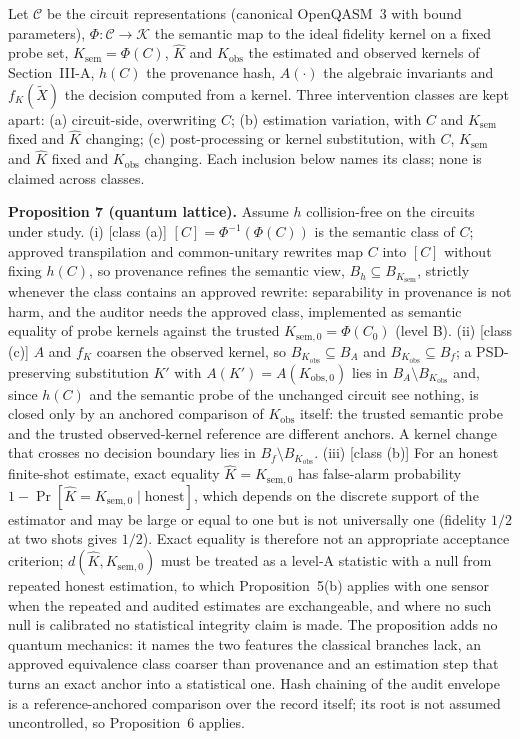 \documentclass[10pt,journal,compsoc]{IEEEtran}
\begin{document}
Let $\mathcal C$ be the circuit representations (canonical OpenQASM~3 with
bound parameters), $\Phi:\mathcal C\to\mathcal K$ the semantic map to the
ideal fidelity kernel on a fixed probe set, $K_{\mathrm{sem}}=\Phi(C)$,
$\hat K$ and $K_{\mathrm{obs}}$ the estimated and observed kernels of
Section~III-A, $h(C)$ the provenance hash, $A(\cdot)$ the algebraic
invariants and $f_K(\tilde X)$ the decision computed from a kernel. Three
intervention classes are kept apart: (a) circuit-side, overwriting $C$; (b)
estimation variation, with $C$ and $K_{\mathrm{sem}}$ fixed and $\hat K$
changing; (c) post-processing or kernel substitution, with $C$,
$K_{\mathrm{sem}}$ and $\hat K$ fixed and $K_{\mathrm{obs}}$ changing. Each
inclusion below names its class; none is claimed across classes.

\textbf{Proposition 7 (quantum lattice).} Assume $h$ collision-free on the
circuits under study. (i) [class (a)] $[C]=\Phi^{-1}(\Phi(C))$ is the
semantic class of $C$; approved transpilation and common-unitary rewrites map
$C$ into $[C]$ without fixing $h(C)$, so provenance refines the semantic
view, $B_h\subseteq B_{K_{\mathrm{sem}}}$, strictly whenever the class
contains an approved rewrite: separability in provenance is not harm, and the
auditor needs the approved class, implemented as semantic equality of probe
kernels against the trusted $K_{\mathrm{sem},0}=\Phi(C_0)$ (level B).
(ii) [class (c)] $A$ and $f_K$ coarsen the observed kernel, so
$B_{K_{\mathrm{obs}}}\subseteq B_A$ and $B_{K_{\mathrm{obs}}}\subseteq B_f$;
a PSD-preserving substitution $K'$ with $A(K')=A(K_{\mathrm{obs},0})$ lies in
$B_A\setminus B_{K_{\mathrm{obs}}}$ and, since $h(C)$ and the semantic probe
of the unchanged circuit see nothing, is closed only by an anchored
comparison of $K_{\mathrm{obs}}$ itself: the trusted semantic probe and the
trusted observed-kernel reference are different anchors. A kernel change that
crosses no decision boundary lies in $B_f\setminus B_{K_{\mathrm{obs}}}$.
(iii) [class (b)] For an honest finite-shot estimate, exact equality
$\hat K=K_{\mathrm{sem},0}$ has false-alarm probability
$1-\Pr[\hat K=K_{\mathrm{sem},0}\mid\text{honest}]$, which depends on the
discrete support of the estimator and may be large or equal to one but is
not universally one (fidelity $1/2$ at two shots gives $1/2$). Exact equality
is therefore not an appropriate acceptance criterion;
$d(\hat K,K_{\mathrm{sem},0})$ must be treated as a level-A statistic with a
null from repeated honest estimation, to which Proposition~5(b) applies with
one sensor when the repeated and audited estimates are exchangeable, and
where no such null is calibrated no statistical integrity claim is made. The
proposition adds no quantum mechanics: it names the two features the
classical branches lack, an approved equivalence class coarser than provenance
and an estimation step that turns an exact anchor into a statistical one.
Hash chaining of the audit envelope is a reference-anchored comparison over
the record itself; its root is not assumed uncontrolled, so Proposition~6
applies.
\end{document}
